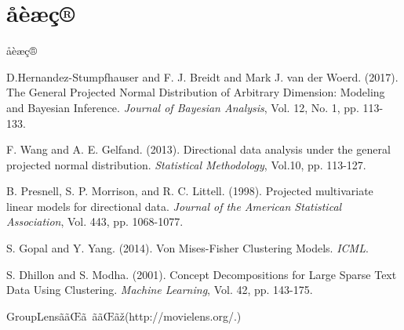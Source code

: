 \documentclass[dvipdfmx]{beamer} %
\begin{document}
\section{åèæç®}
\begin{frame}{åèæç®}

{\scriptsize
\begin{thebibliography}{99}
\beamertemplatetextbibitems %

D.Hernandez-Stumpfhauser and F. J. Breidt and Mark J. van der Woerd. (2017). The General Projected Normal Distribution of Arbitrary Dimension: Modeling and Bayesian Inference. {\it Journal of Bayesian Analysis}, Vol. 12, No. 1, pp. 113-133.

F. Wang and A. E. Gelfand. (2013). Directional data analysis under the general
projected normal distribution. {\it Statistical Methodology}, Vol.10, pp. 113-127.

B. Presnell, S. P. Morrison, and R. C. Littell. (1998). Projected multivariate linear models for
directional data. {\it Journal of the American Statistical Association}, Vol. 443, pp. 1068-1077.


S. Gopal and Y. Yang. (2014). Von Mises-Fisher Clustering Models. {\it ICML}.

S. Dhillon and S. Modha. (2001). Concept Decompositions for Large Sparse Text Data Using
Clustering. {\it Machine Learning}, Vol. 42, pp. 143-175.

GroupLensããŒã ããŒãž(http://movielens.org/.) 

\end{thebibliography}
}

\end{frame}
\end{document}
